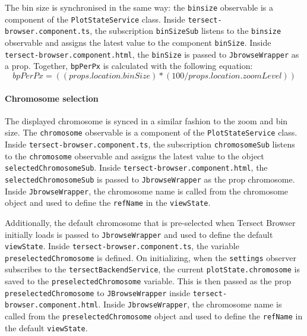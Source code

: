 \documentclass[12pt]{article}
\begin{document}
The bin size is synchronised in the same way: the \verb +binsize+ observable is a component of the \verb +PlotStateService+ class. Inside \verb +tersect-browser.component.ts+, the subscription \verb +binSizeSub+ listens to the \verb +binsize+ observable and assigns the latest value to the component \verb +binSize+. Inside \verb +tersect-browser.component.html+, the \verb +binSize+ is passed to \verb +JbrowseWrapper+ as a prop. 
Together, \verb +bpPerPx+ is calculated with the following equation: \begin{equation} bpPerPx = ((props.location.binSize) * (100 /props.location.zoomLevel)) \end{equation}


\paragraph{Chromosome selection}
The displayed chromosome is synced in a similar fashion to the zoom and bin size. The \verb +chromosome+ observable is a component of the \verb +PlotStateService+ class. Inside \verb +tersect-browser.component.ts+, the subscription \verb +chromosomeSub+ listens to the \verb +chromosome+ observable and assigns the latest value to the object \verb +selectedChromosomeSub+. Inside \verb +tersect-browser.component.html+, the \verb +selectedChromosomeSub+ is passed to \verb +JbrowseWrapper+ as the prop chromosome. Inside \verb +JbrowseWrapper+, the chromosome name is called from the chromosome object and used to define the \verb +refName+ in the \verb +viewState+. 

Additionally, the default chromosome that is pre-selected when Tersect Browser initially loads is passed to \verb +JbrowseWrapper+ and used to define the default \verb +viewState+. Inside \verb +tersect-browser.component.ts+, the variable \verb +preselectedChromosome+ is defined. On initializing, when the \verb +settings+ observer subscribes to the \verb +tersectBackendService+, the current \verb +plotState.chromosome+ is saved to the \verb +preselectedChromosome+ variable. This is then passed as the prop \verb +preselectedChromosome+ to \verb +JBrowseWrapper+ inside \verb +tersect-browser.component.html+.  Inside \verb +JbrowseWrapper+, the chromosome name is called from the \verb +preselectedChromosome+ object and used to define the \verb +refName+ in the default \verb +viewState+. 
\end{document}
